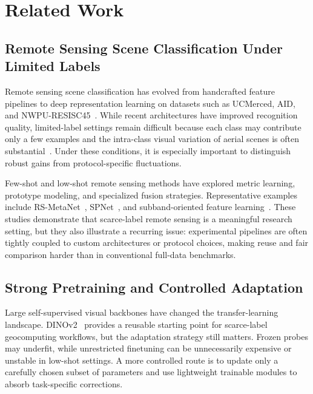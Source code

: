 \section{Related Work}
\label{sec:related_work}

\subsection{Remote Sensing Scene Classification Under Limited Labels}

Remote sensing scene classification has evolved from handcrafted feature pipelines to deep representation learning on datasets such as UCMerced, AID, and NWPU-RESISC45~\cite{yang2010ucm,xia2017aid,cheng2017nwpu,cheng2017survey}. While recent architectures have improved recognition quality, limited-label settings remain difficult because each class may contribute only a few examples and the intra-class visual variation of aerial scenes is often substantial~\cite{thapa2023review}. Under these conditions, it is especially important to distinguish robust gains from protocol-specific fluctuations.

Few-shot and low-shot remote sensing methods have explored metric learning, prototype modeling, and specialized fusion strategies. Representative examples include RS-MetaNet~\cite{li2021rsmetanet}, SPNet~\cite{cheng2022spnet}, and subband-oriented feature learning~\cite{yang2023fewshotsubband}. These studies demonstrate that scarce-label remote sensing is a meaningful research setting, but they also illustrate a recurring issue: experimental pipelines are often tightly coupled to custom architectures or protocol choices, making reuse and fair comparison harder than in conventional full-data benchmarks.

\subsection{Strong Pretraining and Controlled Adaptation}

Large self-supervised visual backbones have changed the transfer-learning landscape. DINOv2~\cite{oquab2023dinov2} provides a reusable starting point for scarce-label geocomputing workflows, but the adaptation strategy still matters. Frozen probes may underfit, while unrestricted finetuning can be unnecessarily expensive or unstable in low-shot settings. A more controlled route is to update only a carefully chosen subset of parameters and use lightweight trainable modules to absorb task-specific corrections.

